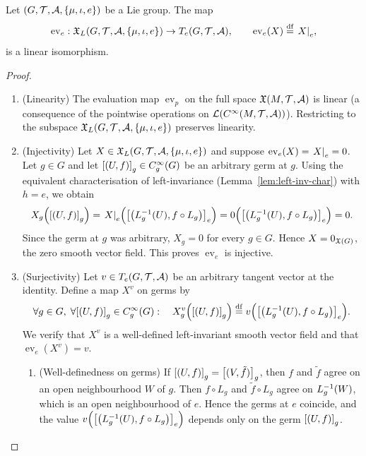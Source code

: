 \documentclass[11pt,reqno]{amsart}
\begin{document}
\begin{Thm}
\label{thm:ev-e-isomorphism}
Let $(G,\T,\A,\set{\mu,\iota,e})$ be a Lie group.
The map
\[
\operatorname{ev}_e:\X_L(G,\T,\A,\set{\mu,\iota,e})\to T_e(G,\T,\A),\qquad
\operatorname{ev}_e(X)\df \eval{X}_{e},
\]
is a linear isomorphism.
\end{Thm}
\begin{proof}
\begin{enumerate}
\item (Linearity)
The evaluation map $\operatorname{ev}_p$ on the full space $\mathfrak{X}(M,\mathcal{T},\mathcal{A})$
is linear (a consequence of the pointwise operations on
$\L\Br{C^\infty(M,\T,\A)}$).  Restricting to the subspace
$\X_L(G,\T,\A,\set{\mu,\iota,e})$ preserves linearity.

\item (Injectivity)
Let $X\in\X_L(G,\T,\A,\set{\mu,\iota,e})$ and suppose
$\operatorname{ev}_e(X)=\eval{X}_{e}=0$.
Let $g\in G$ and let $\SqBr{(U,f)}_{g}\in C_{g}^\infty(G)$ be an
arbitrary germ at $g$.
Using the equivalent characterisation of left-invariance
(Lemma~\ref{lem:left-inv-char}) with $h=e$, we obtain
\[
X_g\Br{\SqBr{(U,f)}_{g}}
=\eval{X}_{e}\Br{\SqBr{\Br{L_g\inv(U),f\circ L_g}}_{e}}
=0\Br{\SqBr{\Br{L_g\inv(U),f\circ L_g}}_{e}}
=0.
\]
Since the germ at $g$ was arbitrary, $X_g=0$ for every $g\in G$.
Hence $X=0_{\mathfrak{X}(G)}$, the zero smooth vector field.
This proves $\operatorname{ev}_e$ is injective.

\item (Surjectivity)
Let $v\in T_e(G,\mathcal{T},\mathcal{A})$ be an arbitrary tangent vector at the identity.
Define a map $X^v$ on germs by
\[
\forall g\in G,\;\forall\SqBr{(U,f)}_{g}\in C_{g}^\infty(G):\quad
X^v_g\Br{\SqBr{(U,f)}_{g}}\df
v\Br{\SqBr{\Br{L_g\inv(U),f\circ L_g}}_{e}}.
\]
We verify that $X^v$ is a well-defined left-invariant smooth vector field
and that $\operatorname{ev}_e(X^v)=v$.

\begin{enumerate}
\item (Well-definedness on germs)
If $\SqBr{(U,f)}_{g}=\SqBr{(V,\tilde f)}_{g}$, then
$f$ and $\tilde f$ agree on an open neighbourhood $W$ of $g$.
Then $f\circ L_g$ and $\tilde f\circ L_g$ agree on $L_g^{-1}(W)$,
which is an open neighbourhood of $e$.
Hence the germs at $e$ coincide, and the value
$v\Br{\SqBr{\Br{L_g\inv(U),f\circ L_g}}_{e}}$
depends only on the germ $\SqBr{(U,f)}_{g}$.


\end{enumerate}
\end{enumerate}
\end{proof}
\end{document}
